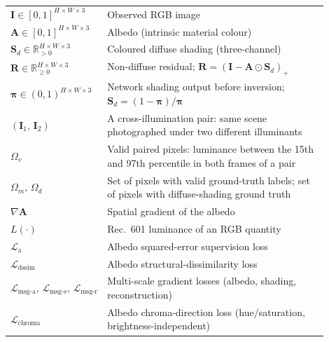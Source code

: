 \begin{longtable}{p{0.25\linewidth} p{0.65\linewidth}}

$\mathbf{I} \in [0,1]^{H \times W \times 3}$
  & Observed RGB image \\

$\mathbf{A} \in [0,1]^{H \times W \times 3}$
  & Albedo (intrinsic material colour) \\

$\mathbf{S}_d \in \mathbb{R}_{>0}^{H \times W \times 3}$
  & Coloured diffuse shading (three-channel) \\

$\mathbf{R} \in \mathbb{R}_{\geq 0}^{H \times W \times 3}$
  & Non-diffuse residual; $\mathbf{R} = (\mathbf{I} - \mathbf{A} \odot \mathbf{S}_d)_{+}$ \\

$\boldsymbol{\pi} \in (0,1)^{H \times W \times 3}$
  & Network shading output before inversion; $\mathbf{S}_d = (1-\boldsymbol{\pi})/\boldsymbol{\pi}$ \\

$(\mathbf{I}_1,\, \mathbf{I}_2)$
  & A cross-illumination pair: same scene photographed under two different illuminants \\

$\Omega_v$
  & Valid paired pixels: luminance between the 15th and 97th percentile in both frames of a pair \\

$\Omega_m,\, \Omega_d$
  & Set of pixels with valid ground-truth labels; set of pixels with diffuse-shading ground truth \\

$\nabla \mathbf{A}$
  & Spatial gradient of the albedo \\

$L(\cdot)$
  & Rec.~601 luminance of an RGB quantity \\

$\mathcal{L}_{\text{a}}$
  & Albedo squared-error supervision loss \\

$\mathcal{L}_{\text{dssim}}$
  & Albedo structural-dissimilarity loss \\

$\mathcal{L}_{\text{msg-a}},\, \mathcal{L}_{\text{msg-s}},\, \mathcal{L}_{\text{msg-r}}$
  & Multi-scale gradient losses (albedo, shading, reconstruction) \\

$\mathcal{L}_{\text{chroma}}$
  & Albedo chroma-direction loss (hue/saturation, brightness-independent) \\


\end{longtable}
